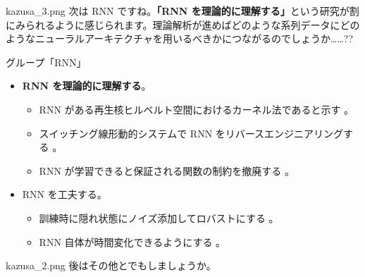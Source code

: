 \documentclass[b5paper,xelatex,ja=standard,10pt]{bxjsarticle}
\begin{document}
\begin{SERIFU}[colback=PaleIris, colbacktitle=PaleIris2]{kazusa_3.png}
次は RNN ですね。\textbf{「RNN を理論的に理解する」}という研究が割にみられるように感じられます。理論解析が進めばどのような系列データにどのようなニューラルアーキテクチャを用いるべきかにつながるのでしょうか……??
\end{SERIFU}

\vspace{1pt}
\begin{PROP}[colback=White, left=0pt]{グループ「RNN」}
\begin{itemize}
  \item \textbf{RNN を理論的に理解する}。
  \begin{itemize}
    \item RNN がある再生核ヒルベルト空間におけるカーネル法であると示す \cite{AdelineFermanian2021}。
    \item スイッチング線形動的システムで RNN をリバースエンジニアリングする \cite{JimmySmith2021}。
    \item RNN が学習できると保証される関数の制約を撤廃する \cite{LifuWang2021} \cite{AbhishekPanigrahi2021}。
  \end{itemize}
  \item RNN を工夫する。
  \begin{itemize}
    \item 訓練時に隠れ状態にノイズ添加してロバストにする \cite{SoonHoeLim2021}。
    \item RNN 自体が時間変化できるようにする \cite{AstonZhang2021}。
  \end{itemize}
\end{itemize}
\end{PROP}
\vspace{1pt}

\begin{SERIFU}[colback=PaleIris, colbacktitle=PaleIris2]{kazusa_2.png}
後はその他とでもしましょうか。
\end{SERIFU}
\end{document}

